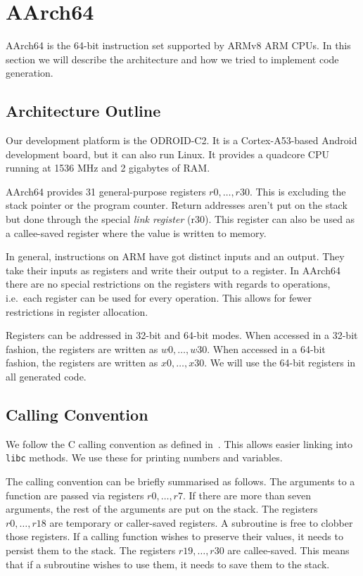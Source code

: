 \chapter{AArch64}

AArch64 is the 64-bit instruction set supported by ARMv8 ARM CPUs.
In this section we will describe the architecture and how we tried to implement code generation.


\section{Architecture Outline}

Our development platform is the ODROID-C2.
It is a Cortex-A53-based Android development board, but it can also run Linux.
It provides a quadcore CPU running at 1536 MHz and 2 gigabytes of RAM\@.

AArch64 provides 31 general-purpose registers $r0, \ldots, r30$.
This is excluding the stack pointer or the program counter.
Return addresses aren't put on the stack but done through the special \emph{link register} (r30).
This register can also be used as a callee-saved register where the value is written to memory.

In general, instructions on ARM have got distinct inputs and an output.
They take their inputs as registers and write their output to a register.
In AArch64 there are no special restrictions on the registers with regards to operations, i.e.\ each register can be used for every operation.
This allows for fewer restrictions in register allocation.

Registers can be addressed in 32-bit and 64-bit modes.
When accessed in a 32-bit fashion, the registers are written as $w0, \ldots, w30$.
When accessed in a 64-bit fashion, the registers are written as $x0, \ldots, x30$.
We will use the 64-bit registers in all generated code.

\section{Calling Convention}

We follow the C calling convention as defined in~\cite{callingconvention}.
This allows easier linking into \texttt{libc} methods.
We use these for printing numbers and variables.

The calling convention can be briefly summarised as follows.
The arguments to a function are passed via registers $r0, \ldots, r7$.
If there are more than seven arguments, the rest of the arguments are put on the stack.
The registers $r0, \ldots, r18$ are temporary or caller-saved registers.
A subroutine is free to clobber those registers.
If a calling function wishes to preserve their values, it needs to persist them to the stack.
The registers $r19, \ldots, r30$ are callee-saved.
This means that if a subroutine wishes to use them, it needs to save them to the stack.

